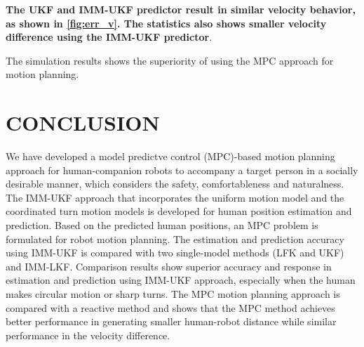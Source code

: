 \documentclass[letterpaper, 10 pt, conference]{ieeeconf}
\begin{document}
	\textbf{The UKF and IMM-UKF predictor result in similar velocity behavior, as shown in \cref{fig:err_v}. The statistics also shows smaller velocity difference using the IMM-UKF predictor}.
	
	The simulation results shows the superiority of using the MPC approach for motion planning.
	
	\section{CONCLUSION}\label{sec:conclusion}
	We have developed a model predictve control (MPC)-based motion planning approach for human-companion robots to accompany a target person in a socially desirable manner, which considers the safety, comfortableness and naturalness.
	The IMM-UKF approach that incorporates the uniform motion model and the coordinated turn motion models is developed for human position estimation and prediction.
	Based on the predicted human positions, an MPC problem is formulated for robot motion planning.
	The estimation and prediction accuracy using IMM-UKF is compared with two single-model methods (LFK and UKF) and IMM-LKF.
	Comparison results show superior accuracy and response in estimation and prediction using IMM-UKF approach, especially when the human makes circular motion or sharp turns.
	The MPC motion planning approach is compared with a reactive method and shows that the MPC method achieves better performance in generating smaller human-robot distance while similar performance in the velocity difference.
	
\end{document}
